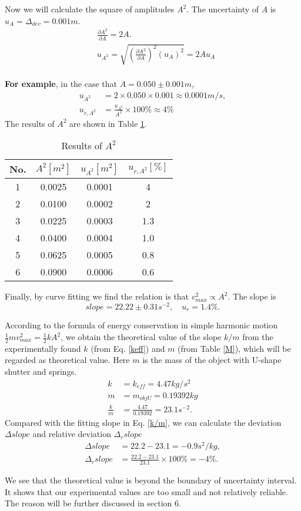     Now we will calculate the square of amplitudes $A^2$. The uncertainty of $A$ is $u_A=\Delta_{dev}=0.001m$.
    \[
    \begin{split}
        &\frac{\partial A^2}{\partial A}=2A.\\
        &u_{A^2}=\sqrt{(\frac{\partial A^2}{\partial A})^2(u_A)^2}=2Au_A\\[0.4cm]
    \end{split}
    \]

    \textbf{For example}, in the case that $A=0.050\pm 0.001m$,
    \[
    \begin{split}
        u_{A^2}&=2\times0.050\times0.001\approx0.0001m/s,\\
        u_{r,A^2}&=\frac{u_{A^2}}{A^2}\times100\%\approx4\%
    \end{split}
    \]
    The results of $A^2$ are shown in Table \ref{adata2}.
    \begin{table}[!h] \small
        \centering
        \begin{tabular}{|c|c|c|c|}
            \hline
            No. & $A^2[m^2]$ & $u_{A^2}[m^2]$ & $u_{r,A^2}[\%]$\\ \hline
            1 & 0.0025 & 0.0001 & 4\\ \hline
            2 & 0.0100 & 0.0002 & 2\\ \hline
            3 & 0.0225 & 0.0003 & 1.3\\ \hline
            4 & 0.0400 & 0.0004 & 1.0\\ \hline
            5 & 0.0625 & 0.0005 & 0.8\\ \hline
            6 & 0.0900 & 0.0006 & 0.6\\ \hline
        \end{tabular}
        \caption{Results of $A^2$}\label{adata2}
    \end{table}

    Finally, by curve fitting we find the relation is that $v_{max}^2\propto A^2$. The slope is
    \begin{equation}\label{k/m}
        slope=22.22\pm0.31s^{-2}, \quad u_r=1.4\%.
    \end{equation}

    According to the formula of energy conservation in simple harmonic motion $\frac{1}{2}mv_{max}^2=\frac{1}{2}kA^2$, we obtain the theoretical value of the slope $k/m$ from the experimentally found $k$ (from Eq. \ref{keff}) and $m$ (from Table \ref{M}), which will be regarded as theoretical value. Here $m$ is the mass of the object with U-shape shutter and springs.
    \[
    \begin{split}
        k&=k_{eff}=4.47kg/s^2\\
        m&=m_{objU}=0.19392kg\\
        \frac{k}{m}&=\frac{4.47}{0.19392}=23.1s^{-2}.
    \end{split}
    \]
    Compared with the fitting slope in Eq. \ref{k/m}, we can calculate the deviation $\Delta slope$ and relative deviation $\Delta_r slope$
    \[
    \begin{split}
        \Delta slope&=22.2-23.1=-0.9s^2/kg,\\
        \Delta_r slope&=\frac{22.2-23.1}{23.1}\times 100\%=-4\%.
    \end{split}
    \]

    We see that the theoretical value is beyond the boundary of uncertainty interval. It shows that our experimental values are too small and not relatively reliable. The reason will be further discussed in section 6.

